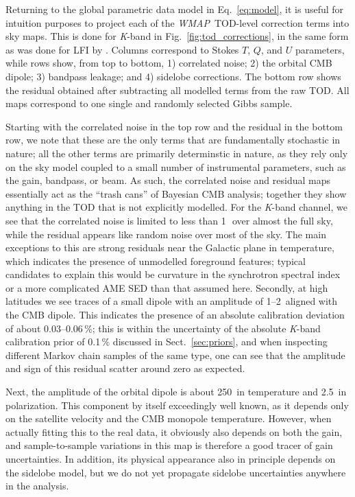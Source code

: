 \documentclass[twocolumn]{../../common/aa}
\def\WMAP{\emph{WMAP}}
\newcommand{\K}[0]{\textit K}
\begin{document}
Returning to the global parametric data model in Eq.~\eqref{eq:model}, it is useful for intuition purposes to project each of the \WMAP\ TOD-level correction terms into sky maps. This is done for \K-band in Fig.~\ref{fig:tod_corrections}, in the same form as was done for LFI by \citet{bp10}. Columns correspond to Stokes $T$, $Q$, and $U$ parameters, while rows show, from top to bottom, 1) correlated noise; 2) the orbital CMB dipole; 3) bandpass leakage; and 4) sidelobe corrections. The bottom row shows the residual obtained after subtracting all modelled terms from the raw TOD. All maps correspond to one single and randomly selected Gibbs sample.

Starting with the correlated noise in the top row and the residual in the bottom row, we note that these are the only terms that are fundamentally stochastic in nature; all the other terms are primarily determinstic in nature, as they rely only on the sky model coupled to a small number of instrumental parameters, such as the gain, bandpass, or beam. As such, the correlated noise and residual maps essentially act as the ``trash cans'' of Bayesian CMB analysis; together they show anything in the TOD that is not explicitly modelled. For the \K-band channel, we see that the correlated noise is limited to less than 1\,\muK\ over almost the full sky, while the residual appears like random noise over most of the sky. The main exceptions to this are strong residuals near the Galactic plane in temperature, which indicates the presence of unmodelled foreground features; typical candidates to explain this would be curvature in the synchrotron spectral index or a more complicated AME SED than that assumed here. Secondly, at high latitudes we see traces of a small dipole with an amplitude of 1--2\muK\ aligned with the CMB dipole. This indicates the presence of an absolute calibration deviation of about 0.03--0.06\,\%; this is within the uncertainty of the absolute \K-band calibration prior of 0.1\,\% discussed in Sect.~\ref{sec:priors}, and when inspecting different Markov chain samples of the same type, one can see that the amplitude and sign of this residual scatter around zero as expected.

Next, the amplitude of the orbital dipole is about 250\muK\ in temperature and 2.5\muK\ in polarization. This component by itself exceedingly well known, as it depends only on the satellite velocity and the CMB monopole temperature. However, when actually fitting this to the real data, it obviously also depends on both the gain, and sample-to-sample variations in this map is therefore a good tracer of gain uncertainties. In addition, its physical appearance also in principle depends on the sidelobe model, but we do not yet propagate sidelobe uncertainties anywhere in the analysis.
\end{document}

